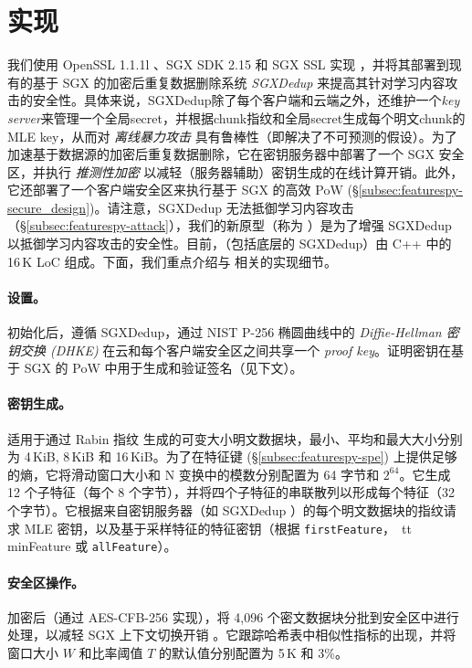 \section{实现}
\label{sec:featurespy-implementation}
我们使用 OpenSSL 1.1.1l \cite{openssl}、SGX SDK 2.15 \cite{sgxsdk} 和 SGX SSL \cite{sgxssl} 实现 \sysnameF，并将其部署到现有的基于 SGX 的加密后重复数据删除系统 {\em SGXDedup} \cite{ren21} 来提高其针对学习内容攻击的安全性。具体来说，SGXDedup除了每个客户端和云端之外，还维护一个{\em key server}来管理一个全局secret，并根据chunk指纹和全局secret生成每个明文chunk的MLE key，从而对 {\em 离线暴力攻击} 具有鲁棒性（即解决了不可预测的假设）\cite{bellare13b}。为了加速基于数据源的加密后重复数据删除，它在密钥服务器中部署了一个 SGX 安全区，并执行 {\em 推测性加密} \cite{eduardo19} 以减轻（服务器辅助）密钥生成的在线计算开销。此外，它还部署了一个客户端安全区来执行基于 SGX 的高效 PoW (\S\ref{subsec:featurespy-secure_design})。请注意，SGXDedup 无法抵御学习内容攻击（\S\ref{subsec:featurespy-attack}），我们的新原型（称为 \prototype）是为了增强 SGXDedup 以抵御学习内容攻击的安全性。目前，\prototype（包括底层的 SGXDedup）由 C++ 中的 16\,K LoC 组成。下面，我们重点介绍与 \prototype 相关的实现细节。


\paragraph*{设置。}
初始化后，\prototype 遵循 SGXDedup，通过 NIST P-256 椭圆曲线中的 {\em Diffie-Hellman 密钥交换 (DHKE)} 在云和每个客户端安全区之间共享一个 {\em proof key}。证明密钥在基于 SGX 的 PoW 中用于生成和验证签名（见下文）。


\paragraph*{密钥生成。}
\prototype 适用于通过 Rabin 指纹 \cite{rabin81} 生成的可变大小明文数据块，最小、平均和最大大小分别为 4\,KiB, 8\,KiB 和 16\,KiB。为了在特征键 (\S\ref{subsec:featurespy-spe}) 上提供足够的熵，它将滑动窗口大小和 N 变换中的模数分别配置为 64 字节和 $2^{64}$。它生成 12 个子特征（每个 8 个字节），并将四个子特征的串联散列以形成每个特征（32 个字节）。它根据来自密钥服务器（如 SGXDedup \cite{ren21}）的每个明文数据块的指纹请求 MLE 密钥，以及基于采样特征的特征密钥（根据 {\tt firstFeature}，{\ tt minFeature} 或 {\tt allFeature}）。


\paragraph*{安全区操作。}
加密后（通过 AES-CFB-256 实现），\prototype 将 4,096 个密文数据块分批到安全区中进行处理，以减轻 SGX 上下文切换开销 \cite{arnautov16}。它跟踪哈希表中相似性指标的出现，并将窗口大小 $W$ 和比率阈值 $T$ 的默认值分别配置为 5\,K 和 3\%。

